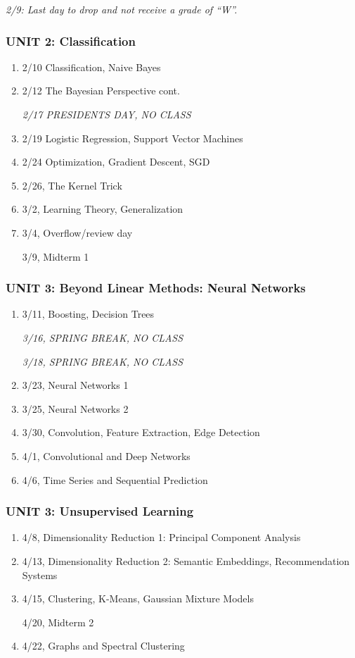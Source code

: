 \documentclass[10pt]{article}
\begin{document}
\noindent\textit{2/9: Last day to drop and not receive a grade of ``W''.}
\subsubsection{UNIT 2: Classification}
\begin{enumerate}\itemsep0em 
	\setcounter{enumi}{4}
	\item 2/10 Classification, Naive Bayes
	\item 2/12 The Bayesian Perspective cont.
	
	\textit{2/17 PRESIDENTS DAY, NO CLASS}
	\item 2/19 Logistic Regression, Support Vector Machines
	\item 2/24 Optimization, Gradient Descent, SGD
	\item 2/26, The Kernel Trick
	\item 3/2, Learning Theory, Generalization
	\item 3/4, Overflow/review day
	 
	 3/9, Midterm 1 
\end{enumerate}
\subsubsection{UNIT 3: Beyond Linear Methods: Neural Networks}
\begin{enumerate}\itemsep0em 
	\setcounter{enumi}{11}
	\item 3/11, Boosting, Decision Trees
	
	\textit{3/16, SPRING BREAK, NO CLASS}
	
	\textit{3/18, SPRING BREAK, NO CLASS}
	\item 3/23, Neural Networks 1
	\item 3/25, Neural Networks 2
	\item 3/30, Convolution, Feature Extraction, Edge Detection
	\item 4/1, Convolutional and Deep Networks
	\item 4/6, Time Series and Sequential Prediction
\end{enumerate}
\subsubsection{UNIT 3: Unsupervised Learning}
\begin{enumerate}\itemsep0em 
	\setcounter{enumi}{17} 
	\item 4/8, Dimensionality Reduction 1: Principal Component Analysis
	\item 4/13, Dimensionality Reduction 2: Semantic Embeddings, Recommendation Systems
	\item 4/15, Clustering, K-Means, Gaussian Mixture Models
	 
	 4/20, Midterm 2
	\item 4/22, Graphs and Spectral Clustering
\end{enumerate}
\end{document}
